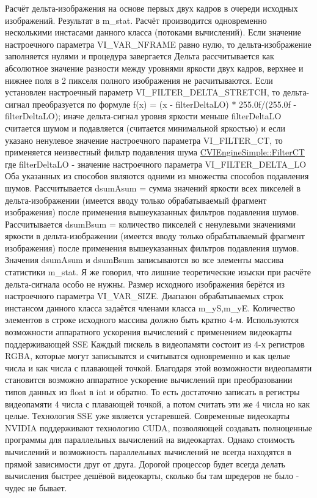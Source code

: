 Расчёт дельта-\/изображения на основе первых двух кадров в очереди исходных изображений. Результат в m\+\_\+stat. Расчёт производится одновременно несколькими инстасами данного класса (потоками вычислений). Если значение настроечного параметра V\+I\+\_\+\+V\+A\+R\+\_\+\+N\+F\+R\+A\+M\+E равно нулю, то дельта-\/изображение заполняется нулями и процедура завергается Дельта рассчитывается как абсолютное значение разности между уровнями яркости двух кадров, верхнее и нижнее поля в 2 пикселя полного изображения не расчитываются. Если установлен настроечный параметр V\+I\+\_\+\+F\+I\+L\+T\+E\+R\+\_\+\+D\+E\+L\+T\+A\+\_\+\+S\+T\+R\+E\+T\+C\+H, то дельта-\/сигнал преобразуется по формуле f(x) = (x -\/ filter\+Delta\+L\+O) $\ast$ 255.\+0f/(255.\+0f -\/ filter\+Delta\+L\+O); иначе дельта-\/сигнал уровня яркости меньше filter\+Delta\+L\+O считается шумом и подавляется (считается минимальной яркостью) и если указано ненулевое значение настроечного параметра V\+I\+\_\+\+F\+I\+L\+T\+E\+R\+\_\+\+C\+T, то применяется неизвестный фильтр подавления шума \hyperlink{class_c_v_i_engine_simple_a2b0441394c18c07d7d90fb13998c0355}{C\+V\+I\+Engine\+Simple\+::\+Filter\+C\+T} где filter\+Delta\+L\+O -\/ значение настроечного параметра V\+I\+\_\+\+F\+I\+L\+T\+E\+R\+\_\+\+D\+E\+L\+T\+A\+\_\+\+L\+O Оба указанных из способов являются одними из множества способов подавления шумов. Рассчитывается dsum\+Asum = сумма значений яркости всех пикселей в дельта-\/изображении (имеется вводу только обрабатываемый фрагмент изображения) после применения вышеуказанных фильтров подавления шумов. Рассчитывается dsum\+Bsum = количество пикселей с ненулевыми значениями яркости в дельта-\/изображении (имеется вводу только обрабатываемый фрагмент изображения) после применения вышеуказанных фильтров подавления шумов. Значения dsum\+Asum и dsumВsum записываются во все элементы массива статистики m\+\_\+stat. Я же говорил, что лишние теоретические изыски при расчёте дельта-\/сигнала особо не нужны. Размер исходного изображения берётся из настроечного параметра V\+I\+\_\+\+V\+A\+R\+\_\+\+S\+I\+Z\+E. Диапазон обрабатываемых строк инстансом данного класса задаётся членами класса m\+\_\+y\+S,m\+\_\+y\+E. Количество элементов в строке исходного массива должно быть кратно 4-\/м. Используются возможности аппаратного ускорения вычислений с применением видеокарты поддерживающей S\+S\+E Каждый пискель в видеопамяти состоит из 4-\/х регистров R\+G\+B\+A, которые могут записыватся и считыватся одновременно и как целые числа и как числа с плавающей точкой. Благодаря этой возможности видеопамяти становится возможно аппаратное ускорение вычислений при преобразовании типов данных из float в int и обратно. То есть достаточно записать в регистры видеопамяти 4 числа с плавающей точкой, а потом считать эти же 4 числа но как целые. Технология S\+S\+E уже является устаревшей. Современные видеокарты N\+V\+I\+D\+I\+A поддерживают технологию C\+U\+D\+A, позволяющей создавать полноценные программы для параллельных вычислений на видеокартах. Однако стоимость вычислений и возможность параллельных вычислений не всегда находятся в прямой зависимости друг от друга. Дорогой процессор будет всегда делать вычисления быстрее дешёвой видеокарты, сколько бы там шредеров не было -\/ чудес не бывает. 

